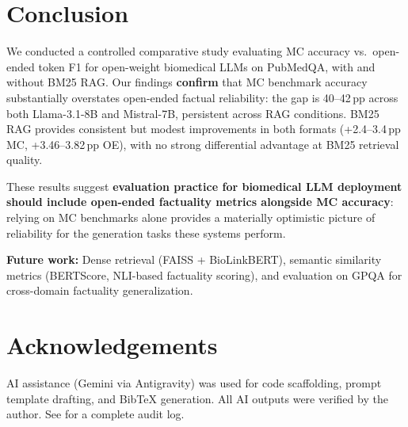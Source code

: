 \documentclass[sigconf, nonacm]{acmart}
\begin{document}
\section{Conclusion}

We conducted a controlled comparative study evaluating MC accuracy vs.\ open-ended
token F1 for open-weight biomedical LLMs on PubMedQA, with and without BM25 RAG.
Our findings \textbf{confirm} that MC benchmark accuracy substantially overstates
open-ended factual reliability: the gap is 40--42\,pp across both Llama-3.1-8B and
Mistral-7B, persistent across RAG conditions. BM25 RAG provides consistent but modest
improvements in both formats (+2.4--3.4\,pp MC, +3.46--3.82\,pp OE), with no strong
differential advantage at BM25 retrieval quality.

These results suggest \textbf{evaluation practice for biomedical LLM deployment
should include open-ended factuality metrics alongside MC accuracy}: relying on MC
benchmarks alone provides a materially optimistic picture of reliability for the
generation tasks these systems perform.

\textbf{Future work:} Dense retrieval (FAISS + BioLinkBERT), semantic similarity
metrics (BERTScore, NLI-based factuality scoring), and evaluation on GPQA for
cross-domain factuality generalization.

\section*{Acknowledgements}
AI assistance (Gemini via Antigravity) was used for code scaffolding, prompt
template drafting, and BibTeX generation. All AI outputs were verified by the
author. See  for a complete audit log.



\end{document}
